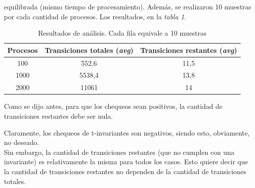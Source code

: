 \documentclass{article}
\begin{document}
    equilibrada (mismo tiempo de procesamiento). Además, se realizaron 10 muestras por cada 
    cantidad de procesos. Los resultados, en la \emph{tabla 1}.\newline \newline
    \begin{center}
        \begin{table}[H]
            \begin{tabular}{||c|c|c||} 
                \hline
                Procesos & Transiciones totales (\emph{avg}) & Transiciones restantes (\emph{avg}) \\ [0.5ex] 
                \hline\hline
                100 & 552,6 & 11,5 \\ 
                \hline
                1000 & 5538,4 & 13,8 \\
                \hline
                2000 & 11061 & 14 \\
                \hline
            \end{tabular}
            \caption{Resultados de análisis. Cada fila equivale a 10 muestras}
        \end{table}
    \end{center} \par
    Como se dijo antes, para que los chequeos sean positivos, la cantidad de transiciones restantes
    debe ser nula. \par
    Claramente, los chequeos de t-invariantes son negativos, siendo esto, obviamente, no deseado. \\
    Sin embargo, la cantidad de transiciones restantes (que no cumplen con una invariante) es 
    relativamente la misma para todos los casos. Esto quiere decir que la cantidad de transiciones
    restantes no dependen de la cantidad de transiciones totales.
\end{document}
